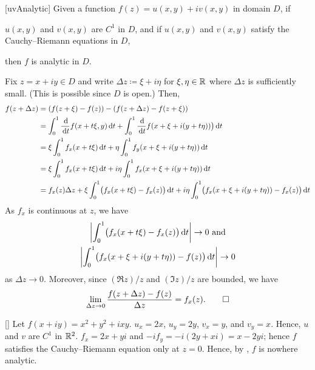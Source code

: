 \documentclass[../complex_variables_1.tex]{subfiles}
\begin{document}
\begin{Theorem}{}[uvAnalytic]
    Given a function \(f(z) = u(x,y)+iv(x,y)\) in domain \(D\), if
    \begin{enumerate}[label=(\arabic*)]
        \ii \(u(x, y)\) and \(v(x, y)\) are \(C^1\) in \(D\), and if
        \ii \(u(x,y)\) and \(v(x,y)\) satisfy the Cauchy--Riemann equations in \(D\),
    \end{enumerate}
    then \(f\) is analytic in \(D\).
\end{Theorem}
\begin{myproof}[Proof]
    Fix \(z = x + iy \in D\) and write \(\Delta z \coloneqq \xi + i\eta\) for \(\xi,\eta \in \RR\)
    where \(\Delta z\) is sufficiently small. (This is possible since \(D\) is open.)
    Then,
    \begin{align*}
        f(z+\Delta z)
        &= (f(z+\xi)-f(z)) - (f(z+\Delta z)-f(z+\xi)) \\
        &= \int_0^1 \frac{\,\mathrm{d}}{\,\mathrm{d} t} f(x+t\xi, y) \,\mathrm{d} t + \int_0^1 \frac{\,\mathrm{d}}{\,\mathrm{d} t} f(x+\xi+i(y+t\eta)) \bigr) \,\mathrm{d} t \\
        &= \xi\int_0^1 f_x(x+t\xi) \,\mathrm{d} t + \eta\int_0^1 f_y(x+\xi+i(y+t\eta)) \,\mathrm{d} t \\
        &= \xi\int_0^1 f_x(x+t\xi) \,\mathrm{d} t + i\eta\int_0^1 f_x(x+\xi+i(y+t\eta)) \,\mathrm{d} t \\
        &= f_x(z) \Delta z + \xi\int_0^1 \bigl(f_x(x+t\xi) - f_x(z)\bigr) \,\mathrm{d} t + i\eta\int_0^1 \bigl(f_x(x+\xi+i(y+t\eta))-f_x(z)\bigr) \,\mathrm{d} t
    \end{align*}
    As \(f_x\) is continuous at \(z\), we have
    \begin{gather*}
        \left| \int_0^1 \bigl(f_x(x+t\xi) - f_x(z)\bigr) \,\mathrm{d} t \right| \to 0\text{ and} \\
        \left| \int_0^1 \bigl(f_x(x+\xi+i(y+t\eta))-f(z)\bigr) \,\mathrm{d} t \right| \to 0
    \end{gather*}
    as \(\Delta z \to 0\). Moreover, since \((\Re z) / z\) and \((\Im z)/z\) are bounded,
    we have
    \begin{equation*}
        \lim_{\Delta z \to 0} \frac{f(z+\Delta z) - f(z)}{\Delta z} = f_x(z)\text.
        \qedhere
    \end{equation*}
\end{myproof}

\begin{Example}{}[]
    Let \(f(x+iy) = x^2 + y^2 + ixy\).
    \(u_x = 2x\), \(u_y = 2y\), \(v_x = y\), and \(v_y = x\).
    Hence, \(u\) and \(v\) are \(C^1\) in \(\RR^2\).
    \(f_x = 2x + yi\) and \(-i f_y = -i (2y + xi) = x - 2yi\);
    hence \(f\) satisfies the Cauchy--Riemann equation only at \(z = 0\).
    Hence, by , \(f\) is nowhere analytic.
\end{Example}
\end{document}
